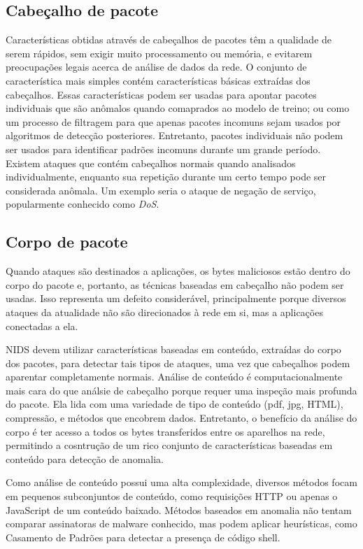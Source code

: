 \subsection{Cabeçalho de pacote}
Características obtidas através de  cabeçalhos de pacotes têm a qualidade de serem rápidos, sem exigir muito
processamento ou memória, e evitarem preocupações legais acerca de análise de dados da rede.
O conjunto de característica mais simples contém características básicas extraídas dos cabeçalhos. Essas
características podem ser usadas para apontar pacotes individuais que são anômalos quando comaprados ao modelo de
treino; ou como um processo de filtragem para que apenas pacotes incomuns sejam usados por algoritmos de detecção
posteriores.
Entretanto, pacotes individuais não podem ser usados para identificar padrões incomuns durante um grande período.
Existem ataques que contém cabeçalhos normais quando analisados individualmente, enquanto sua repetição durante
um certo tempo pode ser considerada anômala. Um exemplo seria o ataque de negação de serviço, popularmente conhecido
como \textit{DoS}.

\subsection{Corpo de pacote}
Quando ataques são destinados a aplicações, os bytes maliciosos estão dentro do corpo do
pacote e, portanto, as técnicas baseadas em cabeçalho não podem ser usadas. Isso representa um defeito considerável,
principalmente porque diversos ataques da atualidade não são direcionados à rede em si, mas a aplicações conectadas a
ela.
\par NIDS devem utilizar características baseadas em conteúdo, extraídas do corpo dos pacotes, para detectar tais tipos 
de ataques, uma vez que cabeçalhos podem aparentar completamente normais. Análise de conteúdo é computacionalmente 
mais cara do que análsie de cabeçalho porque requer uma inspeção mais profunda do pacote. Ela lida com uma variedade de 
tipo de conteúdo (pdf, jpg, HTML), compressão, e métodos que encobrem dados. Entretanto, o benefício da análise do
corpo é ter acesso a todos os bytes transferidos entre os aparelhos na rede, permitindo a cosntrução de um rico
conjunto de características baseadas em conteúdo para detecção de anomalia.
\par Como análise de conteúdo possui uma alta complexidade, diversos métodos focam em pequenos subconjuntos de
conteúdo, como requisições HTTP ou apenas o JavaScript de um conteúdo baixado. Métodos baseados em anomalia não tentam
comparar assinatoras de malware conhecido, mas podem aplicar heurísticas, como Casamento de Padrões para detectar a
presença de código shell.

